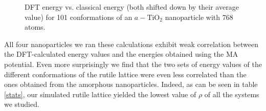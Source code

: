 \documentclass[aps,prb,twocolumn,amsmath,amssymb,superscriptaddress,longbibliography]{revtex4-1}
\newcommand\tab[1][1cm]{\hspace*{#1}} %
\begin{document}
\begin{figure}[htb]
\caption{DFT energy vs. classical energy (both shifted down by their average value) for 101 conformations of an $a-\text{TiO}_2$ nanoparticle with 768 atoms.}
\label{nnp_768}
\end{figure}
  
\tab All four nanoparticles we ran these calculations exhibit weak correlation between the DFT-calculated energy values and the energies obtained using the MA potential. 
Even more surprisingly we find that the two sets of energy values of the different conformations of the rutile lattice were even less correlated than the ones obtained from the amorphous nanoparticles. 
Indeed, as can be seen in table \ref{stats}, our simulated rutile lattice yielded the lowest value of $\rho$ of all the systems we studied.
\end{document}
